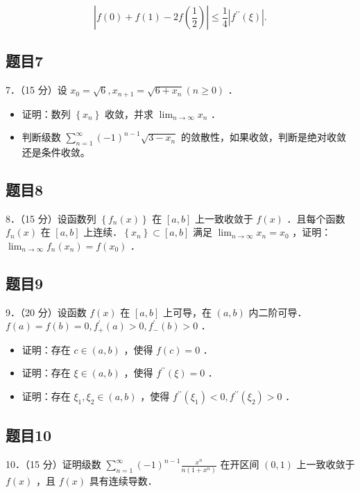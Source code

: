 \documentclass{article}
\begin{document}
\[
\left|f(0)+f(1)-2 f\left(\frac{1}{2}\right)\right| \leq \frac{1}{4}\left|f^{\prime \prime}(\xi)\right| .
\]

\subsection{题目7}
7．（15 分）设 \(x_{0}=\sqrt{6}, x_{n+1}=\sqrt{6+x_{n}}(n \geq 0)\) ．

\begin{itemize}
  \item[（1）] 证明：数列 \(\left\{x_{n}\right\}\) 收敛，并求 \(\lim _{n \rightarrow \infty} x_{n}\) ．
  \item[（2）] 判断级数 \(\sum_{n=1}^{\infty}(-1)^{n-1} \sqrt{3-x_{n}}\) 的敛散性，如果收敛，判断是绝对收敛还是条件收敛。
\end{itemize}

\subsection{题目8}
8．（15 分）设函数列 \(\left\{f_{n}(x)\right\}\) 在 \([a, b]\) 上一致收敛于 \(f(x)\) ．且每个函数 \(f_{n}(x)\) 在 \([a, b]\) 上连续．\(\left\{x_{n}\right\} \subset[a, b]\) 满足 \(\lim _{n \rightarrow \infty} x_{n}=x_{0}\) ，证明： \(\lim _{n \rightarrow \infty} f_{n}\left(x_{n}\right)=f\left(x_{0}\right)\) ．

\subsection{题目9}
9．（20 分）设函数 \(f(x)\) 在 \([a, b]\) 上可导，在 \((a, b)\) 内二阶可导．\(f(a)=f(b)=0, f_{+}^{\prime}(a)>0, f_{-}^{\prime}(b)>0\) ．

\begin{itemize}
  \item[（1）] 证明：存在 \(c \in(a, b)\) ，使得 \(f(c)=0\) ．
  \item[（2）] 证明：存在 \(\xi \in(a, b)\) ，使得 \(f^{\prime \prime}(\xi)=0\) ．
  \item[（3）] 证明：存在 \(\xi_{1}, \xi_{2} \in(a, b)\) ，使得 \(f^{\prime \prime}\left(\xi_{1}\right)<0, f^{\prime \prime}\left(\xi_{2}\right)>0\) ．
\end{itemize}

\subsection{题目10}
10．（15 分）证明级数 \(\sum_{n=1}^{\infty}(-1)^{n-1} \frac{x^{n}}{n\left(1+x^{n}\right)}\) 在开区间 \((0,1)\) 上一致收敛于 \(f(x)\) ，且 \(f(x)\) 具有连续导数．
\end{document}
